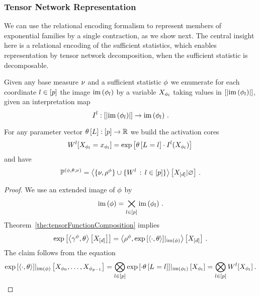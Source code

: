 \subsubsection{Tensor Network Representation} 

We can use the relational encoding formalism to represent members of exponential families by a single contraction, as we show next.
The central insight here is a relational encoding of the sufficient statistics, which enables representation by tensor network decomposition, when the sufficient statistic is decomposable.

\begin{theorem}\label{def:expFamilyTensorRep}
	Given any base measure $\nu$ and a sufficient statistic $\phi$ we enumerate for each coordinate $l\in[p]$ the image $\mathrm{im}\left(\phi_{l}\right)$ by a variable $X_{\phi_{l}}$ taking values in $[\left|\mathrm{im}\left(\phi_{l}\right)\right|]$, given an interpretation map
		\[ I^{l} : 
		[\left|\mathrm{im}\left(\phi_{l}\right)\right|] \rightarrow \mathrm{im}\left(\phi_{l}\right) \, . \]
	
	For any parameter vector $\theta\left[L\right]:[p]\rightarrow\mathbb{R}$ we build the activation cores
		\[ W^{l}[X_{\phi_{l}}=x_{\phi_{l}}] 
		= \mathrm{exp}\left[\theta\left[L_{}=l_{}\right] \cdot I^{l}(X_{\phi_{l}}) \right] \,   \]
	and have
		\[ \mathbb{P}^{(\phi,\theta,\nu)} = 
		\left\langle \{\nu,\rho^{\phi}\}\cup\{W^{l} \, : \, l\in[p]\}\right\rangle \left[ X_{[d]} | \varnothing \right] \, . 
		\]
\end{theorem}
\begin{proof}
	We use an extended image of $\phi$ by  %
		\[ \mathrm{im}\left(\phi\right) = \bigtimes_{l\in[p]} \mathrm{im}\left(\phi_{l}\right) \, . \]
	Theorem~\ref{the:tensorFunctionComposition} implies
		\[ \mathrm{exp}\left[\left\langle \gamma^{\phi},\theta\right\rangle \left[ X_{[d]} \right]\right]
		= \left\langle \rho^{\phi}, {\mathrm{exp}\left[\braket{\cdot, \theta}\right]}|_{\mathrm{im}\left(\phi\right)}\right\rangle \left[ X_{[d]} \right] \, . \]
	The claim follows from the equation
		\[ {\mathrm{exp}\left[\braket{\cdot, \theta}\right]}|_{\mathrm{im}\left(\phi\right)}\left[X_{\phi_{0}},\ldots,X_{\phi_{p-1}}\right]
		= \bigotimes_{l\in[p]} {\mathrm{exp}\left[\cdot \theta\left[L_{}=l_{}\right]\right]}|_{\mathrm{im}\left(\phi_{l}\right)}\left[X_{\phi_{l}}\right]
		= \bigotimes_{l\in[p]} W^{l}[X_{\phi_{l}}] \, . \]
\end{proof}


